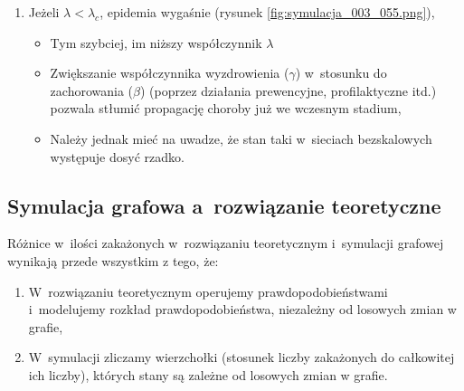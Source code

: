 \begin{enumerate}
\begin{enumerate}[label=\arabic*), nolistsep]
\item Jeżeli $\lambda < \lambda_c$, epidemia wygaśnie (rysunek \ref{fig:symulacja_003_055.png}),
  \begin{itemize}
  \item Tym szybciej, im niższy współczynnik $\lambda$
  \item Zwiększanie współczynnika wyzdrowienia ($\gamma$) w~stosunku do zachorowania ($\beta$) (poprzez działania prewencyjne, profilaktyczne itd.) pozwala stłumić propagację choroby już we wczesnym stadium,
  \item Należy jednak mieć na uwadze, że stan taki w~sieciach bezskalowych występuje dosyć rzadko.
  \end{itemize}
\end{enumerate}

\subsection{Symulacja grafowa a~rozwiązanie teoretyczne}
\label{subsec:wnioski_sym_a_teo}

Różnice w~ilości zakażonych w~rozwiązaniu teoretycznym i~symulacji grafowej wynikają przede wszystkim z tego, że:
\begin{enumerate}[label=\arabic*), nolistsep]
\item W~rozwiązaniu teoretycznym operujemy prawdopodobieństwami i~modelujemy rozkład prawdopodobieństwa, niezależny od losowych zmian w grafie,
\item W~symulacji zliczamy wierzchołki (stosunek liczby zakażonych do całkowitej ich liczby), których stany są zależne od losowych zmian w grafie.
\end{enumerate}


\end{enumerate}
